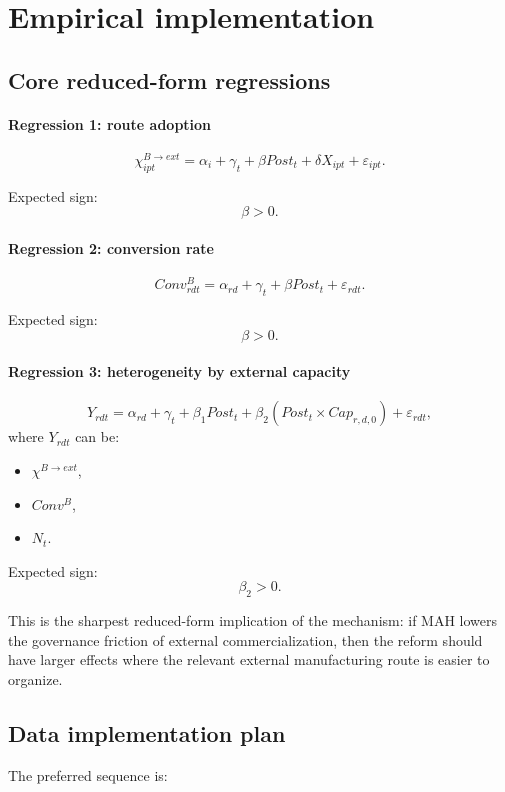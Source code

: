 \documentclass[12pt]{ctexart}
\begin{document}
\section{Empirical implementation}

\subsection{Core reduced-form regressions}

\paragraph{Regression 1: route adoption}
\[
\chi^{B\to ext}_{ipt}
=
\alpha_i+\gamma_t+\beta Post_t+\delta X_{ipt}+\varepsilon_{ipt}.
\]

Expected sign:
\[
\beta>0.
\]

\paragraph{Regression 2: conversion rate}
\[
Conv^B_{rdt}
=
\alpha_{rd}+\gamma_t+\beta Post_t+\varepsilon_{rdt}.
\]

Expected sign:
\[
\beta>0.
\]

\paragraph{Regression 3: heterogeneity by external capacity}
\[
Y_{rdt}
=
\alpha_{rd}
+
\gamma_t
+
\beta_1 Post_t
+
\beta_2(Post_t\times Cap_{r,d,0})
+
\varepsilon_{rdt},
\]
where \(Y_{rdt}\) can be:
\begin{itemize}[leftmargin=2em]
    \item \(\chi^{B\to ext}\),
    \item \(Conv^B\),
    \item \(N_t\).
\end{itemize}

Expected sign:
\[
\beta_2>0.
\]

This is the sharpest reduced-form implication of the mechanism:
if MAH lowers the governance friction of external commercialization, then the reform should
have larger effects where the relevant external manufacturing route is easier to organize.

\subsection{Data implementation plan}

The preferred sequence is:
\end{document}
